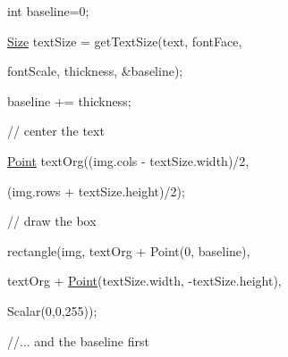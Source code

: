 {\ttfamily }

{\ttfamily }

{\ttfamily int baseline=0;}

{\ttfamily }

{\ttfamily }

{\ttfamily \mbox{\hyperlink{classorg_1_1opencv_1_1core_1_1_size}{Size}} text\+Size = get\+Text\+Size(text, font\+Face,}

{\ttfamily }

{\ttfamily }

{\ttfamily font\+Scale, thickness, \&baseline);}

{\ttfamily }

{\ttfamily }

{\ttfamily baseline += thickness;}

{\ttfamily }

{\ttfamily }

{\ttfamily // center the text}

{\ttfamily }

{\ttfamily }

{\ttfamily \mbox{\hyperlink{classorg_1_1opencv_1_1core_1_1_point}{Point}} text\+Org((img.\+cols -\/ text\+Size.\+width)/2,}

{\ttfamily }

{\ttfamily }

{\ttfamily (img.\+rows + text\+Size.\+height)/2);}

{\ttfamily }

{\ttfamily }

{\ttfamily // draw the box}

{\ttfamily }

{\ttfamily }

{\ttfamily rectangle(img, text\+Org + Point(0, baseline),}

{\ttfamily }

{\ttfamily }

{\ttfamily text\+Org + \mbox{\hyperlink{classorg_1_1opencv_1_1core_1_1_point}{Point}}(text\+Size.\+width, -\/text\+Size.\+height),}

{\ttfamily }

{\ttfamily }

{\ttfamily Scalar(0,0,255));}

{\ttfamily }

{\ttfamily }

{\ttfamily //... and the baseline first}

{\ttfamily }

{\ttfamily }

